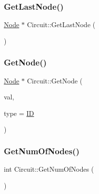 \mbox{\label{class_circuit_aeb86f8d79ac985158d41fbee772cc4fc}} 
\subsubsection{\texorpdfstring{Get\+Last\+Node()}{GetLastNode()}}
{\footnotesize\ttfamily \hyperlink{class_node}{Node} $\ast$ Circuit\+::\+Get\+Last\+Node (\begin{DoxyParamCaption}{ }\end{DoxyParamCaption})}

\mbox{\label{class_circuit_ad3a83fee410a9d1324725300564e34b3}} 
\subsubsection{\texorpdfstring{Get\+Node()}{GetNode()}}
{\footnotesize\ttfamily \hyperlink{class_node}{Node} $\ast$ Circuit\+::\+Get\+Node (\begin{DoxyParamCaption}\item[{const double \&}]{val,  }\item[{\hyperlink{_data_8h_a6262d734859ff0be0daa3fe3b8eccbcd}{S\+E\+A\+R\+C\+H\+\_\+\+BY}}]{type = {\ttfamily \hyperlink{_data_8h_a6262d734859ff0be0daa3fe3b8eccbcda001479a58fb44c39a29b20d565081a68}{ID}} }\end{DoxyParamCaption})}

\mbox{\label{class_circuit_aa78d50e940323ecd69d42fa2219aeff8}} 
\subsubsection{\texorpdfstring{Get\+Num\+Of\+Nodes()}{GetNumOfNodes()}}
{\footnotesize\ttfamily int Circuit\+::\+Get\+Num\+Of\+Nodes (\begin{DoxyParamCaption}{ }\end{DoxyParamCaption})}

\mbox{\label{class_circuit_a2d6a6d1c971baa3ac838e92e935e12eb}} 
